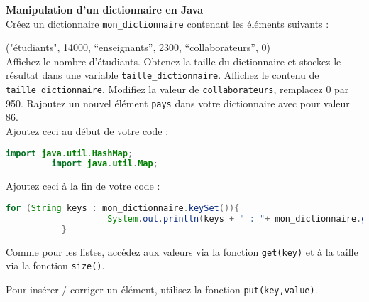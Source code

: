     \begin{Exercice}[15 minutes] \textbf{Manipulation d'un dictionnaire en Java}\\
      	Créez un dictionnaire \lstinline{mon_dictionnaire} contenant les éléments suivants :
      	
      	("étudiants", 14000, ``enseignants'', 2300, ``collaborateurs'', 0)\\
      	
          Affichez le nombre d'étudiants. Obtenez la taille du dictionnaire et stockez le résultat dans une variable \lstinline{taille_dictionnaire}. Affichez le contenu de \lstinline{taille_dictionnaire}. 
          Modifiez la valeur de \lstinline{collaborateurs}, remplacez 0 par 950. Rajoutez un nouvel élément \lstinline{pays} dans votre dictionnaire avec pour valeur 86.\\
      	
      	Ajoutez ceci au début de votre code :
       
      	\begin{lstlisting}[language=Java]
             import java.util.HashMap;
	     import java.util.Map; \end{lstlisting}
	     
	     Ajoutez ceci à la fin de votre code :
	     
	    \begin{lstlisting}[language=Java]
             for (String keys : mon_dictionnaire.keySet()){
            		System.out.println(keys + " : "+ mon_dictionnaire.get(keys));
	       } \end{lstlisting} 
    
        \begin{conseil}
           Comme pour les listes, accédez aux valeurs via la fonction \lstinline{get(key)} et à la taille via la fonction \lstinline{size()}.
            
           Pour insérer / corriger un élément, utilisez la fonction \lstinline{put(key,value)}.
        \end{conseil}
        
        \begin{solution}
            
        \end{solution}
    \end{Exercice}
    
